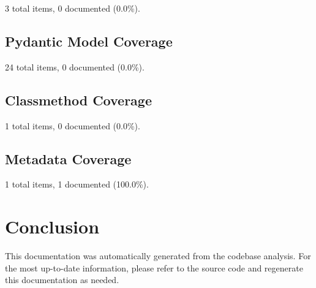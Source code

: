 \documentclass[11pt,a4paper]{article}
\begin{document}
3 total items, 0 documented (0.0\%).

\subsection{Pydantic Model Coverage}

24 total items, 0 documented (0.0\%).

\subsection{Classmethod Coverage}

1 total items, 0 documented (0.0\%).

\subsection{Metadata Coverage}

1 total items, 1 documented (100.0\%).


\section{Conclusion}

This documentation was automatically generated from the codebase analysis. For the most up-to-date information, please refer to the source code and regenerate this documentation as needed.
\end{document}
